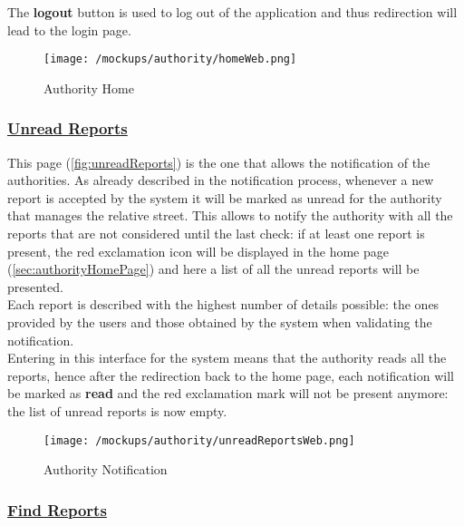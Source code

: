 				The \textbf{logout} button is used to log out of the application and thus redirection will lead to the login page.
				
				\newpage
				
				\begin{figure}[ht!]
					\centering
					\texttt{[image: /mockups/authority/homeWeb.png]}
					\caption{\label{fig:homeWeb} Authority Home}
				\end{figure}
			
			\subsubsection[Unread Reports]{\hyperlink{toc}{Unread Reports}}
				\label{sec:authorityCheckReports}
				
				This page (\autoref{fig:unreadReports}) is the one that allows the notification of the authorities. As already described in the notification process, whenever a new report is accepted by the system it will be marked as unread for the authority that manages the relative street. This allows to notify the authority with all the reports that are not considered until the last check: if at least one report is present, the red exclamation icon will be displayed in the home page (\ref{sec:authorityHomePage}) and here a list of all the unread reports will be presented.\\
				
				Each report is described with the highest number of details possible: the ones provided by the users and those obtained by the system when validating the notification. \\
				
				Entering in this interface for the system means that the authority reads all the reports, hence after the redirection back to the home page, each notification will be marked as \textbf{read} and the red exclamation mark will not be present anymore: the list of unread reports is now empty.
				
				\newpage
				
				\begin{figure}[ht!]
					\centering
					\texttt{[image: /mockups/authority/unreadReportsWeb.png]}
					\caption{\label{fig:unreadReports} Authority Notification}
				\end{figure}
			
			\subsubsection[Find Reports]{\hyperlink{toc}{Find Reports}}
				\label{sec:authorityFindReports}
				
